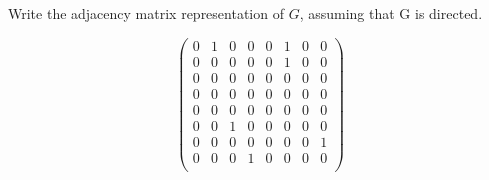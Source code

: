 \begin{prob}
\begin{subprobset}
\begin{subprob}
\begin{soln}
            \end{soln}
        \end{subprob}

        \begin{subprob}
            Write the adjacency matrix representation of $G$, assuming that G is directed.

            \begin{soln}

                \[
                \begin{pmatrix}
                    0 & 1 & 0 & 0 & 0 & 1 & 0 & 0\\
                    0 & 0 & 0 & 0 & 0 & 1 & 0 & 0\\
                    0 & 0 & 0 & 0 & 0 & 0 & 0 & 0\\
                    0 & 0 & 0 & 0 & 0 & 0 & 0 & 0\\
                    0 & 0 & 0 & 0 & 0 & 0 & 0 & 0\\
                    0 & 0 & 1 & 0 & 0 & 0 & 0 & 0\\
                    0 & 0 & 0 & 0 & 0 & 0 & 0 & 1\\
                    0 & 0 & 0 & 1 & 0 & 0 & 0 & 0\\
                \end{pmatrix}
                \]

            \end{soln}
            
        \end{subprob}

    \end{subprobset}
\end{prob}
